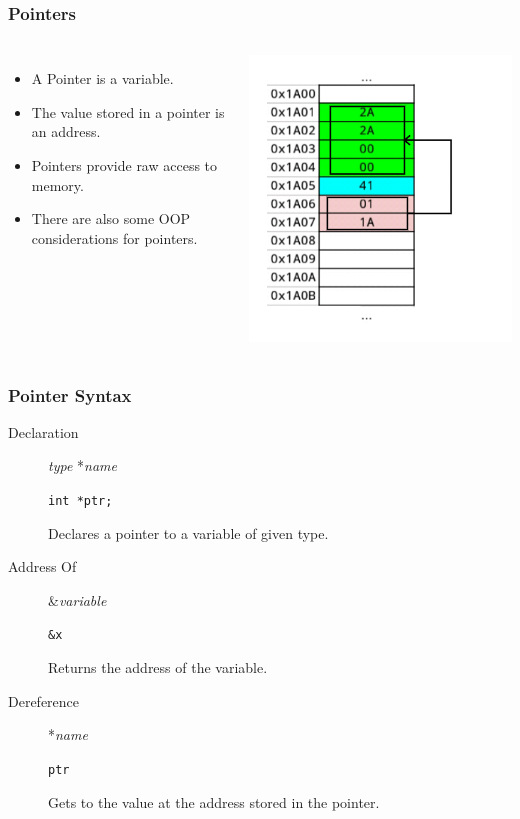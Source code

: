 \documentclass[handout]{beamer}
\begin{document}
\begin{frame}
    \frametitle{Pointers}
    \begin{columns}
        \begin{itemize}
            \item A Pointer is a variable.
            \item The value stored in a pointer is an address.
            \item Pointers provide raw access to memory.
            \item There are also some OOP considerations for pointers.
        \end{itemize}
        \includegraphics[height=0.60\textheight]{images/memptr}
    \end{columns}
\end{frame}

\begin{frame}
    \frametitle{Pointer Syntax}
    \begin{description}
        \item[Declaration]   {\em type} *{\em name}
            \par {\tt int *ptr;}
            \par Declares a pointer to a variable of given type.
        \item[Address Of]  \&{\em variable}
            \par {\tt \&x}
            \par Returns the address of the variable.
        \item[Dereference] *{\em name}
            \par {\tt *ptr}
            \par Gets to the value at the address stored in the pointer.
    \end{description}
\end{frame}
\end{document}
